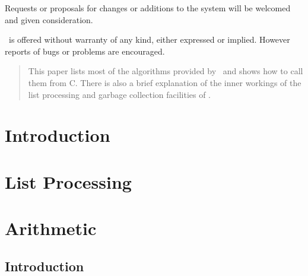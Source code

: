 Requests or proposals for changes or additions to the system will
be welcomed and given consideration.

\saclib\ is offered without warranty of any kind, either expressed or implied.
However reports of bugs or problems are encouraged.


\vfill

\begin{abstract}
This paper lists most of the algorithms provided by \saclib\ and shows how
to call them from C. There is also a brief explanation of the inner
workings of the list processing and garbage collection facilities of
\saclib.
\end{abstract}

\clearpage
{}
\tableofcontents
\clearpage
\listoffigures
\clearpage
{}


\chapter{Introduction}
\label{c:I}




\chapter{List Processing}
\label{c:LP}




\chapter{Arithmetic}
\label{c:A}

\section{Introduction}
\label{c:A s:I}

